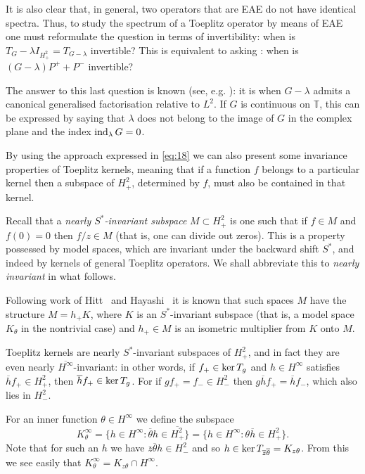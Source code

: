 \documentclass[11pt]{article}
\def\TT{\mathbb T}
\def\ol{\overline}
\def\ker{\mathop{\rm ker}\nolimits}
\def\ind{\mathop{\rm ind}\nolimits}
\begin{document}
It is also clear that, in general, two operators that are EAE do not have identical spectra. 
Thus, to study the spectrum of a Toeplitz operator by means of EAE one must
reformulate the question in terms of invertibility:
when is $T_G-\lambda I_{H^2_+} = T_{G-\lambda}$ invertible? 
This is equivalent to asking : when is $(G-\lambda)P^+ + P^-$ invertible?

The answer to this last question is known (see, e.g. \cite{MP}): it is when $G-\lambda$ admits a 
canonical generalised factorisation relative to $L^2$.
If $G$ is continuous on $\TT$, this can be expressed by saying
that $\lambda$ does not belong to the image of $G$ in the complex plane
and the index $\ind_\lambda G=0$.

By using the approach expressed in \eqref{eq:18} we can also present some invariance properties
of Toeplitz kernels, meaning that if a function $f$ belongs to a 
particular kernel then a subspace of $H^2_+$, determined by $f$, must also be contained in
that kernel.

Recall that
a {\em nearly $S^*$-invariant subspace\/} $M \subset H^2_+$ is one such that
if $f \in M$ and $f(0) =0$ then $f/z \in M$ (that is, one can divide out zeros). This is
a property possessed by model spaces, which are invariant under the backward shift $S^*$,
and indeed by kernels of general Toeplitz operators.
We shall abbreviate this to {\em nearly invariant\/} in what follows.

Following work of Hitt~\cite{hitt} and Hayashi~\cite{hayashi86,hayashi90} it is known that such spaces $M$ have the structure
$M=h_+K$, where $K$ is an $S^*$-invariant subspace (that is, a model space $K_\theta$
in the nontrivial case) and $h_+ \in M$ is an isometric multiplier from $K$ onto $M$.

Toeplitz kernels are nearly $S^*$-invariant subspaces of $H^2_+$, and
in fact they are even nearly $\ol{H^\infty}$-invariant: 
in other words, if $f_+ \in \ker T_g$ and
$h \in H^\infty$ satisfies $\ol h f_+  \in H^2_+$, then $\ol h f_+  \in \ker T_g$.
For if $g f_+ = f_- \in H^2_-$ then $g \ol h f_+= \ol h f_-$, which also lies in $H^2_-$.

For an inner function $\theta \in H^\infty$ we define the subspace
\[
K^\infty_{ \theta}= \{h \in H^\infty: \ol\theta h \in \ol{H^2_+}\}=\{h \in H^\infty: \theta \ol h \in H^2_+ \}.
\]
Note that for such an $h$ we have $\ol z \ol \theta h\in H^2_-$ and so $h \in \ker T_{\ol z\ol\theta}=K_{z\theta}$.
From this we see easily that $K^\infty_{\theta} = K_{z\theta} \cap H^\infty$.
\end{document}
